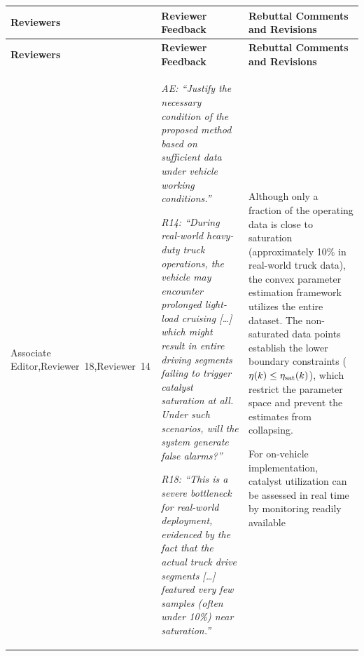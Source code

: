 \documentclass[letterpaper, 10pt]{article}
\newcommand{\rquote}[1]{\textcolor{reviewtext}{\emph{#1}}}
\begin{document}
\renewcommand{\arraystretch}{1.5}
\setlength{\tabcolsep}{6pt}
\begin{longtable}{
    >{\raggedright\arraybackslash\small}p{}
    >{\small}p{}
    >{\small}p{}}
    \toprule
    \rowcolor{headerbg}
    \textbf{Reviewers}         &
    \textbf{Reviewer Feedback} &
    \textbf{Rebuttal Comments and Revisions}                                                             \\ \midrule
    \endfirsthead
    \toprule
    \rowcolor{headerbg}
    \textbf{Reviewers}         &
    \textbf{Reviewer Feedback} &
    \textbf{Rebuttal Comments and Revisions}                                                             \\ \midrule
    \endhead
    \bottomrule
    \endfoot
    Associate Editor,\newline Reviewer~18,\newline Reviewer~14
                               &
    \rquote{AE: ``Justify the necessary condition of the proposed method based on sufficient data under vehicle working
        conditions.''}
    \par\medskip
    \rquote{R14: ``During real-world heavy-duty truck operations, the vehicle may encounter prolonged light-load
        cruising [\ldots] which might result in entire driving segments failing to trigger catalyst saturation at all. Under
        such scenarios, will the system generate false alarms?''}
    \par\medskip
    \rquote{R18: ``This is a severe bottleneck for real-world deployment, evidenced by the fact that the actual truck
        drive segments [\ldots] featured very few samples (often under 10\%) near saturation.''}
                               &
    Although only a fraction of the operating data is close to saturation (approximately 10\% in real-world truck data),
    the convex parameter estimation framework utilizes the entire dataset. The non-saturated data points
    establish the lower boundary constraints ($\eta(k) \le \eta_{\text{sat}}(k)$), which restrict the parameter space and
    prevent the estimates from collapsing.
    \par\smallskip
    For on-vehicle implementation, catalyst utilization can be assessed in real time by monitoring readily available

\end{longtable}
\end{document}

